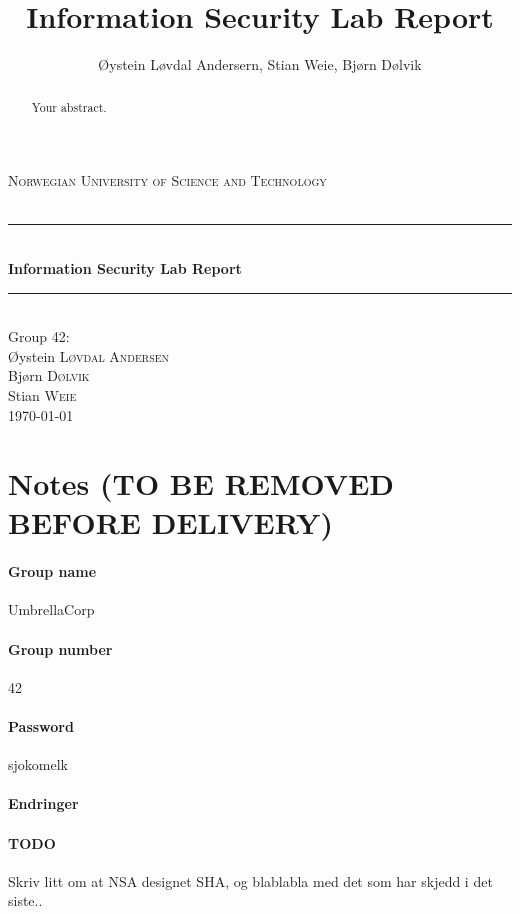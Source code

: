 \documentclass[11pt, a4paper]{article}
\title{Information Security Lab Report}
\author{Øystein Løvdal Andersern, Stian Weie, Bjørn Dølvik}
\newcommand{\HRule}{\rule{\linewidth}{0.5mm}}
\begin{document}
\begin{titlepage}
\begin{center}

\textsc{\LARGE Norwegian University of Science and Technology}\\[1.5cm]

\textsc{\Large }\\[0.5cm]

\HRule \\[0.4cm]
{ \huge \bfseries Information Security Lab Report \\[0.4cm] }

\HRule \\[1.5cm]

{\large Group 42:}\\[0.5cm]

Øystein \textsc{Løvdal Andersen}\\
Bjørn \textsc{Dølvik}\\
Stian \textsc{Weie}\\[4.0cm]

{\large \today}

\end{center}
\end{titlepage}

\begin{abstract}
Your abstract.
\end{abstract}
\tableofcontents
\clearpage

\section{Notes (TO BE REMOVED BEFORE DELIVERY)}
\paragraph{Group name} UmbrellaCorp
\paragraph{Group number} 42
\paragraph{Password} sjokomelk
\paragraph{Endringer} 
\paragraph{TODO} Skriv litt om at NSA designet SHA, og blablabla med det som har skjedd i det siste..
\end{document}

